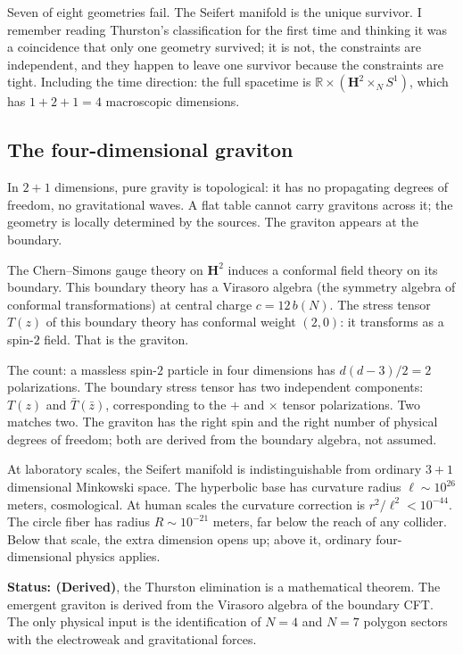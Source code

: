 Seven of eight geometries fail. The Seifert manifold is the unique
survivor. I remember reading Thurston's classification for the first
time and thinking it was a coincidence that only one geometry survived;
it is not, the constraints are independent, and they happen to leave
one survivor because the constraints are tight. Including the time direction: the full spacetime is
$\mathbb{R} \times (\mathbf{H}^2 \times_N S^1)$, which has
$1 + 2 + 1 = 4$ macroscopic dimensions.

\subsection*{The four-dimensional graviton}

In $2+1$ dimensions, pure gravity is topological: it has no propagating
degrees of freedom, no gravitational waves. A flat table cannot carry
gravitons across it; the geometry is locally determined by the sources.
The graviton appears at the boundary.

The Chern--Simons gauge theory on $\mathbf{H}^2$ induces a conformal
field theory on its boundary. This boundary theory has a Virasoro
algebra (the symmetry algebra of conformal transformations) at
central charge $c = 12\,b(N)$. The stress tensor $T(z)$ of this
boundary theory has conformal weight $(2, 0)$: it transforms as a
spin-$2$ field. That is the graviton.

The count: a massless spin-$2$ particle in four dimensions has
$d(d-3)/2 = 2$ polarizations. The boundary stress tensor has two
independent components: $T(z)$ and $\bar{T}(\bar{z})$, corresponding
to the $+$ and $\times$ tensor polarizations. Two matches two. The
graviton has the right spin and the right number of physical degrees
of freedom; both are derived from the boundary algebra, not assumed.

At laboratory scales, the Seifert manifold is indistinguishable from
ordinary $3+1$ dimensional Minkowski space. The hyperbolic base has
curvature radius $\ell \sim 10^{26}$ meters, cosmological. At human
scales the curvature correction is $r^2/\ell^2 < 10^{-44}$. The circle
fiber has radius $R \sim 10^{-21}$ meters, far below the reach of any
collider. Below that scale, the extra dimension opens up; above it,
ordinary four-dimensional physics applies.

\textbf{Status: (Derived)}, the Thurston elimination is a mathematical
theorem. The emergent graviton is derived from the Virasoro algebra of
the boundary CFT. The only physical input is the identification of
$N = 4$ and $N = 7$ polygon sectors with the electroweak and
gravitational forces.


